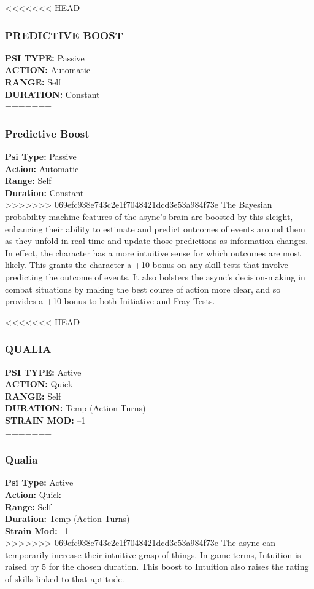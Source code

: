 <<<<<<< HEAD
\subsubsection{PREDICTIVE BOOST}
\textbf{PSI TYPE:} Passive \\ 
\textbf{ACTION:} Automatic \\ 
\textbf{RANGE:} Self \\ 
\textbf{DURATION:} Constant \\
=======
\subsubsection{Predictive Boost}
\textbf{Psi Type:} Passive \\ 
\textbf{Action:} Automatic \\ 
\textbf{Range:} Self \\ 
\textbf{Duration:} Constant \\
>>>>>>> 069efc938e743c2e1f7048421dcd3e53a984f73e
The Bayesian probability machine features of the
async’s brain are boosted by this sleight, enhancing
their ability to estimate and predict outcomes of
events around them as they unfold in real-time and
update those predictions as information changes.
In effect, the character has a more intuitive sense
for which outcomes are most likely. This grants the
character a +10 bonus on any skill tests that involve
predicting the outcome of events. It also bolsters
the async’s decision-making in combat situations by
making the best course of action more clear, and so
provides a +10 bonus to both Initiative and Fray Tests.

<<<<<<< HEAD
\subsubsection{QUALIA}
\textbf{PSI TYPE:} Active \\ 
\textbf{ACTION:} Quick \\ 
\textbf{RANGE:} Self \\ 
\textbf{DURATION:} Temp (Action Turns) \\
\textbf{STRAIN MOD:} –1 \\
=======
\subsubsection{Qualia}
\textbf{Psi Type:} Active \\ 
\textbf{Action:} Quick \\ 
\textbf{Range:} Self \\ 
\textbf{Duration:} Temp (Action Turns) \\
\textbf{Strain Mod:} –1 \\
>>>>>>> 069efc938e743c2e1f7048421dcd3e53a984f73e
The async can temporarily increase their intuitive
grasp of things. In game terms, Intuition is raised by
5 for the chosen duration. This boost to Intuition also
raises the rating of skills linked to that aptitude.

